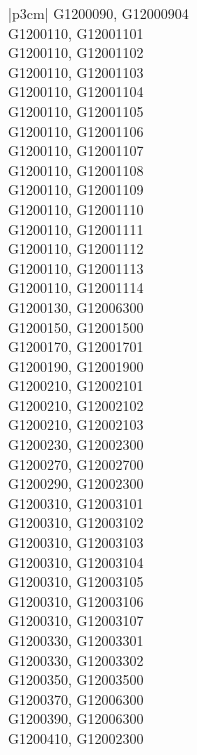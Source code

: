 \begin{customLongTable}{ |p{3cm}| }
G1200090, G12000904 \\ \hline
G1200110, G12001101 \\ \hline
G1200110, G12001102 \\ \hline
G1200110, G12001103 \\ \hline
G1200110, G12001104 \\ \hline
G1200110, G12001105 \\ \hline
G1200110, G12001106 \\ \hline
G1200110, G12001107 \\ \hline
G1200110, G12001108 \\ \hline
G1200110, G12001109 \\ \hline
G1200110, G12001110 \\ \hline
G1200110, G12001111 \\ \hline
G1200110, G12001112 \\ \hline
G1200110, G12001113 \\ \hline
G1200110, G12001114 \\ \hline
G1200130, G12006300 \\ \hline
G1200150, G12001500 \\ \hline
G1200170, G12001701 \\ \hline
G1200190, G12001900 \\ \hline
G1200210, G12002101 \\ \hline
G1200210, G12002102 \\ \hline
G1200210, G12002103 \\ \hline
G1200230, G12002300 \\ \hline
G1200270, G12002700 \\ \hline
G1200290, G12002300 \\ \hline
G1200310, G12003101 \\ \hline
G1200310, G12003102 \\ \hline
G1200310, G12003103 \\ \hline
G1200310, G12003104 \\ \hline
G1200310, G12003105 \\ \hline
G1200310, G12003106 \\ \hline
G1200310, G12003107 \\ \hline
G1200330, G12003301 \\ \hline
G1200330, G12003302 \\ \hline
G1200350, G12003500 \\ \hline
G1200370, G12006300 \\ \hline
G1200390, G12006300 \\ \hline
G1200410, G12002300 \\ \hline

\end{customLongTable}
